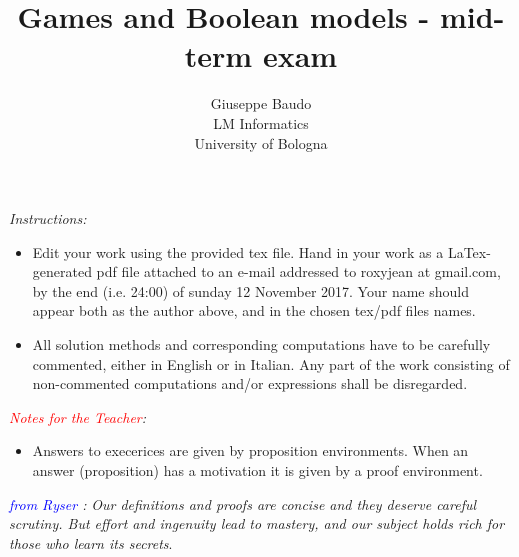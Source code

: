 \documentclass{article}
\begin{document}
\title{Games and Boolean models - mid-term exam}
\author{Giuseppe Baudo\\
{\footnotesize LM Informatics}\\
{\footnotesize University  of Bologna}}
\maketitle

{\footnotesize \textsl{Instructions:}
\begin{itemize}
\item Edit your work using the provided tex file. Hand in your work as a LaTex-generated pdf file attached to an e-mail addressed to roxyjean at gmail.com,
by the end (i.e. 24:00) of sunday 12 November 2017. Your name should appear both as the author above, and in the chosen tex/pdf files names.

\item All solution methods and corresponding computations have to be carefully commented, either in English or in Italian. Any part of the work consisting of
non-commented computations and/or expressions shall be disregarded.
\end{itemize}
}

{\footnotesize \textsl{\textcolor{red}{Notes for the Teacher}:}
	\begin{itemize}
		\item Answers to execerices are given by proposition environments. When an answer (proposition) has a motivation it is given by a proof environment.
	\end{itemize}
}

{\footnotesize \textsl{\textcolor{blue}{from Ryser \cite{ryser01}}:}
	\emph{Our definitions and proofs are concise and they deserve careful scrutiny. But effort and ingenuity lead to mastery, and our subject holds rich for those who learn its secrets}.
}

\end{document}
